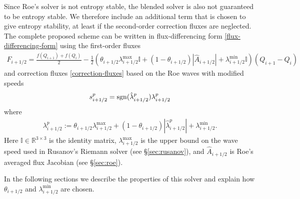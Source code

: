 \documentclass[preprint, 11pt]{article}
\newcommand{\iph}{{i+1/2}}
\newcommand{\bff}{{f}}
\newcommand{\bfF}{{F}}
\newcommand{\bfq}{{Q}}
\newcommand{\sgn}{{\rm sgn}}
\begin{document}
Since Roe's solver is not entropy stable, the blended solver is also
not guaranteed to be entropy stable.  We therefore include an additional term
that is chosen to give entropy stability, at least if the second-order correction
fluxes are neglected.  The complete proposed scheme can be written in
flux-differencing form \eqref{flux-differencing-form} using
the first-order fluxes
\begin{align} \label{blended-flux-1}
  \bfF_{i+1/2} = \frac{\bff(\bfq_{i+1})+\bff(\bfq_i)}{2}
  - \frac{1}{2} \left( \theta_{i+1/2}\lambda_{i+1/2}^{\max}\mathbb{I} + (1-\theta_{i+1/2})|\hat A_{i+1/2}| +\lambda_{i+1/2}^{\min}\mathbb{I}\right)(\bfq_{i+1}-\bfq_{i})
\end{align}
and correction fluxes \eqref{correction-fluxes} based on the Roe waves with
modified speeds
\begin{align} \label{s_p}
    s_{i+1/2}^p=\sgn(\hat\lambda_{i+1/2}^p)\lambda_{i+1/2}^p
\end{align}
where
\begin{align}\label{lambda_p}
  \lambda_{i+1/2}^p := \theta_{i+1/2}\lambda_{i+1/2}^{\max} + (1-\theta_{i+1/2})|\hat \lambda_{i+1/2}^p| + \lambda_\iph^{\min}.
\end{align}
Here $\mathbb{I}\in\mathbb{R}^{3\times 3}$ is the identity matrix,
$\lambda_{i+1/2}^{\max}$ is the
upper bound on the wave speed used in Rusanov's Riemann solver (see \S \ref{sec:rusanov}),
and $\hat A_{i+1/2}$ is Roe's averaged flux Jacobian (see \S \ref{sec:roe}).

In the following sections we describe the properties of this solver and
explain how $\theta_\iph$ and $\lambda^{\min}_\iph$ are chosen.


%
\end{document}
